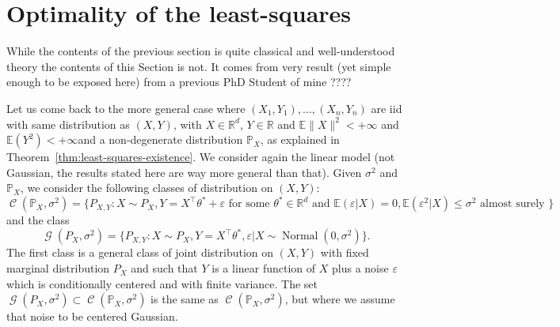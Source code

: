 \documentclass[
	fontsize=11pt, %
	twoside=false, %
	numbers=noenddot, %
]{kaobook}
\DeclareMathOperator{\cC}{\mathcal C}
\DeclareMathOperator{\cG}{\mathcal G}
\DeclareMathOperator{\nor}{Normal}
\newcommand{\eps}{\varepsilon}
\renewcommand{\P}{\mathbb P}
\newcommand{\E}{\mathbb E}
\newcommand{\R}{\mathbb R}
\newcommand{\norm}[1]{\|#1\|}
\begin{document}
\section{Optimality of the least-squares} %
\label{sec:optimality_of_the_least_squares}

While the contents of the previous section is quite classical and well-understood theory the contents of this Section is not.
It comes from very result (yet simple enough to be exposed here) from a previous PhD Student of mine ????

Let us come back to the more general case where $(X_1, Y_1), \ldots, (X_n, Y_n)$ are iid with same distribution as $(X, Y)$, with $X \in \R^d$, $Y \in \R$ and $\E \norm{X}^2 < +\infty$ and $\E(Y^2) < +\infty$and a non-degenerate distribution $\P_X$, as explained in Theorem~\ref{thm:least-squares-existence}.
We consider again the linear model (not Gaussian, the results stated here are way more general than that).
Given $\sigma^2$ and $\P_X$, we consider the following classes of distribution on $(X, Y)$:
\begin{equation*}
	\cC(\P_X, \sigma^2) = \{ P_{X, Y} : X \sim P_X, Y = X^\top \theta^* + \eps \text{ for some } \theta^* \in \R^d \text{ and } \E(\eps | X) = 0, \E(\eps^2 | X) \leq \sigma^2 \text{ almost surely }\}
\end{equation*}
and the class
\begin{equation*}
	\cG(P_X, \sigma^2) = \{ P_{X, Y} : X \sim P_X, Y = X^\top \theta^*, \eps | X \sim \nor(0, \sigma^2) \}.
\end{equation*}
The first class is a general class of joint distribution on $(X, Y)$ with fixed marginal distribution $P_X$ and such that $Y$ is a linear function of $X$ plus a noise $\eps$ which is conditionally centered and with finite variance. The set $\cG(P_X, \sigma^2) \subset \cC(\P_X, \sigma^2)$ is the same as $\cC(\P_X, \sigma^2)$, but where we assume that noise to be centered Gaussian.
\end{document}
